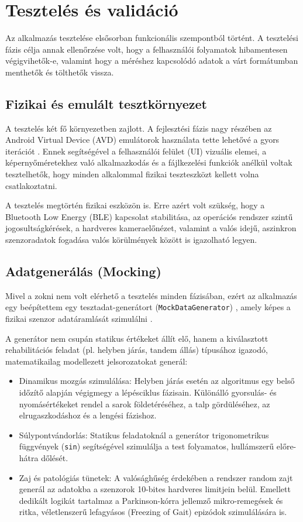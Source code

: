 \section{Tesztelés és validáció}

Az alkalmazás tesztelése elsősorban funkcionális szempontból történt.
A tesztelési fázis célja annak ellenőrzése volt, hogy a felhasználói folyamatok
hibamentesen végigvihetők-e, valamint hogy a méréshez kapcsolódó adatok a várt
formátumban menthetők és tölthetők vissza.

\subsection{Fizikai és emulált tesztkörnyezet}

A tesztelés két fő környezetben zajlott. A fejlesztési fázis nagy részében az
Android Virtual Device (AVD) emulátorok használata tette lehetővé a gyors iterációt
\cite{androidemulator}. Ennek segítségével a felhasználói felület (UI) vizuális elemei,
a képernyőméretekhez való alkalmazkodás és a fájlkezelési funkciók anélkül
voltak tesztelhetők, hogy minden alkalommal fizikai teszteszközt kellett
volna csatlakoztatni.

A tesztelés megtörtén fizikai eszközön is. Erre azért volt szükség, hogy a
Bluetooth Low Energy (BLE) kapcsolat stabilitása, az operációs rendszer szintű
jogosultságkérések, a hardveres kameraelőnézet, valamint a valós idejű,
aszinkron szenzoradatok fogadása valós körülmények között is igazolható legyen.

\subsection{Adatgenerálás (Mocking)}

Mivel a zokni nem volt elérhető a tesztelés minden fázisában, ezért az alkalmazás egy
beépítettem egy tesztadat-generátort (\texttt{MockDataGenerator}) , amely képes a
fizikai szenzor adatáramlását szimulálni \cite{syntheticdata}.

A generátor nem csupán statikus értékeket állít elő, hanem a kiválasztott rehabilitációs
feladat (pl. helyben járás, tandem állás) típusához igazodó, matematikailag modellezett
jelsorozatokat generál:
\begin{itemize}
\item Dinamikus mozgás szimulálása:  Helyben járás esetén az algoritmus egy
belső időzítő alapján végigmegy a lépésciklus fázisain.
Különálló gyorsulás- és nyomásértékeket rendel a sarok földetéréséhez,
a talp gördüléséhez, az elrugaszkodáshoz és a lengési fázishoz.
\item Súlypontvándorlás: Statikus feladatoknál a generátor trigonometrikus függvények
(\texttt{sin}) segítségével szimulálja a test folyamatos, hullámszerű előre-hátra dőlését.
\item Zaj és patológiás tünetek: A valósághűség érdekében a rendszer random zajt generál
az adatokba a szenzorok 10-bites hardveres limitjein belül. Emellett dedikált logikát
tartalmaz a Parkinson-kórra jellemző mikro-remegések és ritka, véletlenszerű lefagyásos
(Freezing of Gait) epizódok szimulálására is.
\end{itemize}

